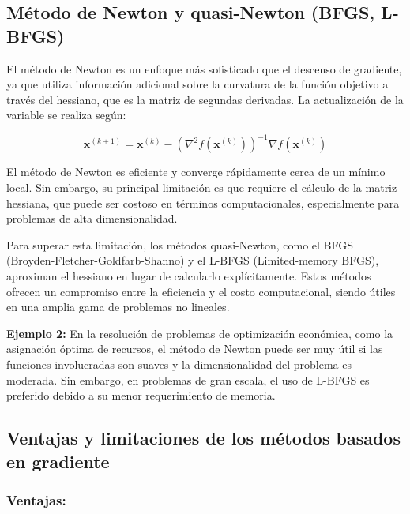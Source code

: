 \subsection{Método de Newton y quasi-Newton (BFGS, L-BFGS)}

\begin{flushleft}
	El método de Newton es un enfoque más sofisticado que el descenso de gradiente, ya que utiliza información adicional sobre la curvatura de la función objetivo a través del hessiano, que es la matriz de segundas derivadas. La actualización de la variable se realiza según:
\end{flushleft}

$$
\mathbf{x}^{(k+1)}=\mathbf{x}^{(k)}-\left(\nabla^{2} f\left(\mathbf{x}^{(k)}\right)\right)^{-1} \nabla f\left(\mathbf{x}^{(k)}\right)
$$

\begin{flushleft}
	El método de Newton es eficiente y converge rápidamente cerca de un mínimo local. Sin embargo, su principal limitación es que requiere el cálculo de la matriz hessiana, que puede ser costoso en términos computacionales, especialmente para problemas de alta dimensionalidad.
\end{flushleft}

\begin{flushleft}
	Para superar esta limitación, los métodos quasi-Newton, como el BFGS (Broyden-Fletcher-Goldfarb-Shanno) y el L-BFGS (Limited-memory BFGS), aproximan el hessiano en lugar de calcularlo explícitamente. Estos métodos ofrecen un compromiso entre la eficiencia y el costo computacional, siendo útiles en una amplia gama de problemas no lineales.
\end{flushleft}

\begin{flushleft}
	\textbf{Ejemplo 2:} En la resolución de problemas de optimización económica, como la asignación óptima de recursos, el método de Newton puede ser muy útil si las funciones involucradas son suaves y la dimensionalidad del problema es moderada. Sin embargo, en problemas de gran escala, el uso de L-BFGS es preferido debido a su menor requerimiento de memoria.
\end{flushleft}

\subsection{Ventajas y limitaciones de los métodos basados en gradiente}

\subsubsection{Ventajas:}

